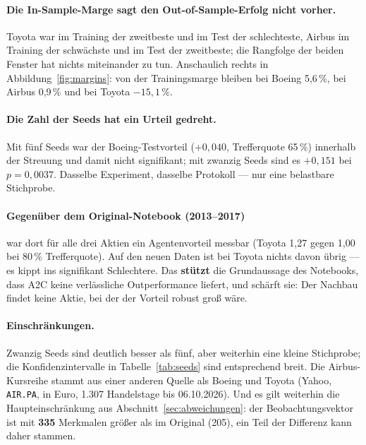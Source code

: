 \paragraph{Die In-Sample-Marge sagt den Out-of-Sample-Erfolg nicht vorher.} Toyota war im
Training der zweitbeste und im Test der schlechteste, Airbus im Training der schwächste und im
Test der zweitbeste; die Rangfolge der beiden Fenster hat nichts miteinander zu tun. Anschaulich
rechts in Abbildung~\ref{fig:margins}: von der Trainingsmarge bleiben bei Boeing 5,6\,\%,
bei Airbus 0,9\,\% und bei Toyota $-15{,}1\,\%$.

\paragraph{Die Zahl der Seeds hat ein Urteil gedreht.} Mit fünf Seeds war der Boeing-Testvorteil
($+0{,}040$, Trefferquote 65\,\%) innerhalb der Streuung und damit nicht signifikant; mit zwanzig
Seeds sind es $+0{,}151$ bei $p=0{,}0037$. Dasselbe Experiment, dasselbe Protokoll --- nur eine
belastbare Stichprobe.

\paragraph{Gegenüber dem Original-Notebook (2013--2017)} war dort für alle drei Aktien ein
Agentenvorteil messbar (Toyota 1,27 gegen 1,00 bei 80\,\% Trefferquote). Auf den neuen Daten ist
bei Toyota nichts davon übrig --- es kippt ins signifikant Schlechtere. Das \textbf{stützt} die
Grundaussage des Notebooks, dass A2C keine verlässliche Outperformance liefert, und schärft sie:
Der Nachbau findet keine Aktie, bei der der Vorteil robust groß wäre.

\paragraph{Einschränkungen.} Zwanzig Seeds sind deutlich besser als fünf, aber weiterhin eine
kleine Stichprobe; die Konfidenzintervalle in Tabelle~\ref{tab:seeds} sind entsprechend breit.
Die Airbus-Kursreihe stammt aus einer anderen Quelle als Boeing und Toyota (Yahoo,
\texttt{AIR.PA}, in Euro, 1.307 Handelstage bis 06.10.2026). Und es gilt weiterhin die
Haupteinschränkung aus Abschnitt~\ref{sec:abweichungen}: der Beobachtungsvektor ist mit
\textbf{335} Merkmalen größer als im Original (205), ein Teil der Differenz kann daher stammen.
